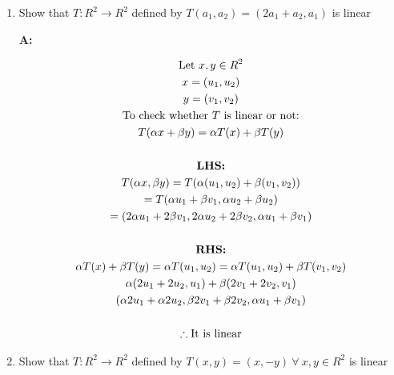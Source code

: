 \documentclass[english,course,fleqn]{lecture}
\newenvironment{qanda}{\begin{enumerate}\setlength{\parindent}{0pt}}{\medskip\end{enumerate}}
\newcommand{\Q}{\bigskip\bfseries \item}
\newcommand{\A}{\par\textbf{A:} \normalfont}
\begin{document}
\begin{qanda}
	\Q Show that $T:R^{2} \rightarrow R^{2}$ defined by $T(a_{1}, a_{2}) = (2 a_{1} + a_{2}, a_{1})$ is linear

	\A

	\begin{gather*}
		\text{Let }x,y \in R^{2}\\
		x = (u_{1}, u_{2})\\
		y = (v_{1}, v_{2})
		\\
		\text{To check whether $T$ is linear or not:}\\
		T(\alpha x + \beta y) = \alpha T(x) + \beta T(y)\\
		\\
		\text{\textbf{LHS:}}\\
		T(\alpha x, \beta y ) = T(\alpha(u_{1}, u_{2}) + \beta (v_{1}, v_{2}))\\
		= T(\alpha u_{1} + \beta v_{1}, \alpha u_{2} + \beta u_{2})\\
		= (2 \alpha u_{1} + 2 \beta v_{1}, 2 \alpha u_{2} + 2 \beta v_{2}, \alpha u_{1} + \beta v_{1} )\\
		\\
		\text{\textbf{RHS:}}\\
		\alpha T(x) + \beta T (y) = \alpha T(u_{1}, u_{2}) = \alpha T(u_{1}, u_{2}) + \beta T(v_{1}, v_{2})\\
		\alpha (2u_{1} + 2u_{2}, u_{1}) + \beta (2v_{1} + 2v_{2}, v_{1})\\
		(\alpha 2 u_{1} + \alpha 2 u_{2}, \beta 2 v_{1} + \beta 2 v_{2}, \alpha u_{1} + \beta v_{1})\\
		\\
		\therefore \text{It is linear}
	\end{gather*}

	\Q Show that $T:R^{2} \rightarrow R^{2}$ defined by $T(x,y) = (x, -y) ~\forall~ x,y \in R^{2}$ is linear


\end{qanda}
\end{document}
